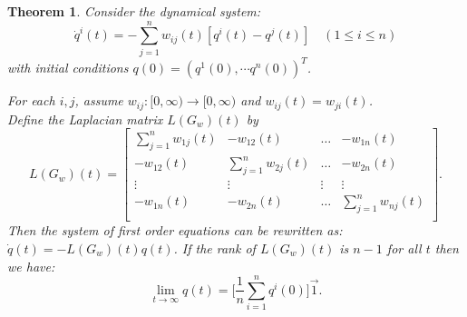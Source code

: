 \documentclass{aims}
\newtheorem{theorem}{Theorem}[section]
\theoremstyle{definition}
\begin{document}
\begin{theorem}
Consider the dynamical system:
\begin{equation}
    \dot q^i(t)=-\sum_{j=1}^n w_{ij}(t)[q^i(t)-q^j(t)]\quad(1\leq i\leq n)
\end{equation}
with initial conditions $q(0)=(q^1(0),\cdots q^n(0))^T$.

For each $i,j$, assume $w_{ij}:[0,\infty)\to[0,\infty)$ and $w_{ij}(t)=w_{ji}(t)$.\\

Define the Laplacian matrix $L(G_w)(t)$ by
\begin{equation}
L(G_w)(t)=\left[\begin{array}{cccc}
    \sum_{j=1}^nw_{1j}(t)&-w_{12}(t)&\dots&-w_{1n}(t)\\
    -w_{12}(t)&\sum_{j=1}^nw_{2j}(t)&\dots&-w_{2n}(t)\\
    \vdots&\vdots&\vdots&\vdots\\
    -w_{1n}(t)&-w_{2n}(t)&\dots&\sum_{j=1}^nw_{nj}(t)\\
    \end{array}\right].
\end{equation}
Then the system of first order equations can be rewritten as: $\dot{q}(t)=-L(G_w)(t)q(t)$.
If the rank of $L(G_w)(t)$ is $n-1$ for all $t$ then we have:
$$\lim_{t\rightarrow\infty}q(t)=\bigg[\frac{1}{n}\sum_{i=1}^nq^i(0)\bigg]\vec{1}.$$
\end{theorem}
\end{document}
